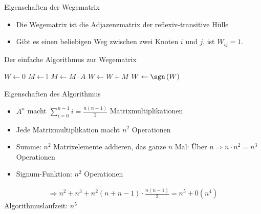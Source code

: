 \begin{frame}{Eigenschaften der Wegematrix}
    \begin{itemize}
        \item Die Wegematrix ist die Adjazenzmatrix der reflexiv-transitive Hülle
        \item Gibt es einen beliebigen Weg zwischen zwei Knoten $i$ und $j$, ist $W_{ij} = 1$.
    \end{itemize}
\end{frame}
\begin{frame}{Der einfache Algorithmus zur Wegematrix}
    \begin{algorithm}
        \begin{algorithmic}
            \State $W \gets 0$ 
                \State $M \gets \mathbb{I}$ 
                    \State $M \gets M\cdot A$
                \EndFor
                \State $W \gets W + M$ 
            \EndFor
            \State $W \gets \sgn\left( W \right)$
        \end{algorithmic}
    \end{algorithm}
\end{frame}
\begin{frame}{Eigenschaften des Algorithmus}
    \begin{itemize}
        \item $A^n$ macht $\sum_{i=0}^{n-1} i =  \frac{n\left( n-1 \right)}{2}$ Matrixmultiplikationen
        \item Jede Matrixmultiplikation macht $n^2$ Operationen
        \item Summe: $n^2$ Matrixelemente addieren, das ganze $n$ Mal: Über $n\Rightarrow n\cdot n^2 = n^3$ Operationen
        \item Signum-Funktion: $n^2$ Operationen
    \end{itemize}
    \begin{align*}
        \Rightarrow n^2 + n^3 + n^2\left( n + n - 1 \right)\cdot\frac{n\left( n-1 \right)}{2} = n^5 + \mathcal{0}\left( n^4 \right)
    \end{align*}
    Algorithmuslaufzeit: $n^5$
\end{frame}
